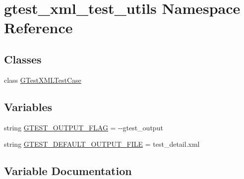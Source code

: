 \hypertarget{namespacegtest__xml__test__utils}{}\section{gtest\+\_\+xml\+\_\+test\+\_\+utils Namespace Reference}
\label{namespacegtest__xml__test__utils}
\subsection*{Classes}
\begin{DoxyCompactItemize}
\item 
class \hyperlink{classgtest__xml__test__utils_1_1_g_test_x_m_l_test_case}{G\+Test\+X\+M\+L\+Test\+Case}
\end{DoxyCompactItemize}
\subsection*{Variables}
\begin{DoxyCompactItemize}
\item 
string \hyperlink{namespacegtest__xml__test__utils_aa354c3ca453d90f496f4cbc576406fb2}{G\+T\+E\+S\+T\+\_\+\+O\+U\+T\+P\+U\+T\+\_\+\+F\+L\+AG} = \textquotesingle{}-\/-\/gtest\+\_\+output\textquotesingle{}
\item 
string \hyperlink{namespacegtest__xml__test__utils_aebe969ed368778716d0619214ff7b853}{G\+T\+E\+S\+T\+\_\+\+D\+E\+F\+A\+U\+L\+T\+\_\+\+O\+U\+T\+P\+U\+T\+\_\+\+F\+I\+LE} = \textquotesingle{}test\+\_\+detail.\+xml\textquotesingle{}
\end{DoxyCompactItemize}


\subsection{Variable Documentation}
